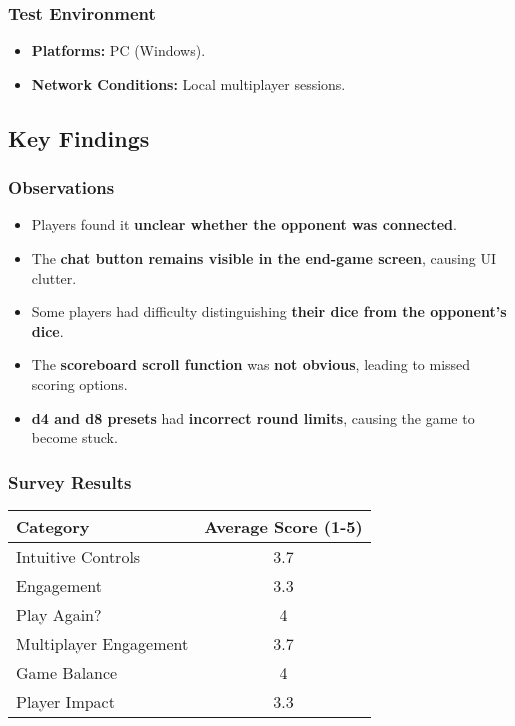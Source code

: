 \documentclass[12pt, titlepage]{article}
\begin{document}
\subsubsection{Test Environment}
\begin{itemize}
    \item \textbf{Platforms:} PC (Windows).
    \item \textbf{Network Conditions:} Local multiplayer sessions.
\end{itemize}

\subsection{Key Findings}
\subsubsection{Observations}
\begin{itemize}
    \item Players found it \textbf{unclear whether the opponent was connected}.
    \item The \textbf{chat button remains visible in the end-game screen}, causing UI clutter.
    \item Some players had difficulty distinguishing \textbf{their dice from the opponent's dice}.
    \item The \textbf{scoreboard scroll function} was \textbf{not obvious}, leading to missed scoring options.
    \item \textbf{d4 and d8 presets} had \textbf{incorrect round limits}, causing the game to become stuck.
\end{itemize}

\subsubsection{Survey Results}
\begin{longtable}{|p{7cm}|c|}
\hline
\textbf{Category} & \textbf{Average Score (1-5)} \\
\hline
Intuitive Controls & 3.7 \\
\hline
Engagement & 3.3 \\
\hline
Play Again? & 4 \\
\hline
Multiplayer Engagement & 3.7 \\
\hline
Game Balance & 4 \\
\hline
Player Impact & 3.3 \\
\hline
\end{longtable}
\end{document}

